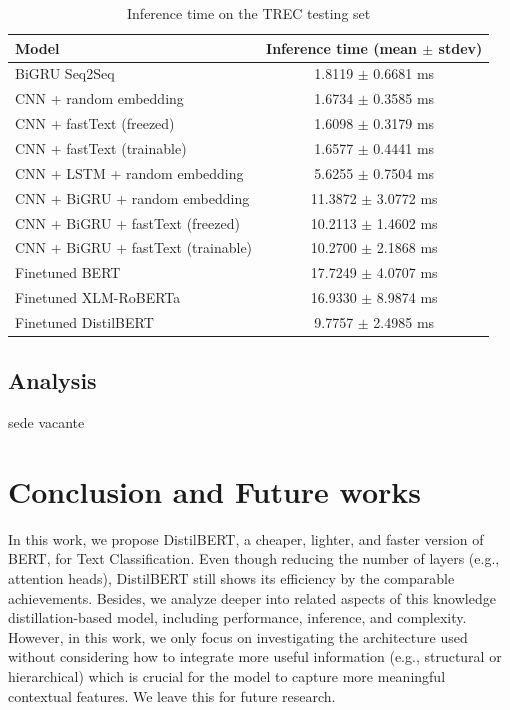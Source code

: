\documentclass[sn-mathphys,Numbered]{sn-jnl}%
\theoremstyle{thmstyleone}%
\theoremstyle{thmstyletwo}%
\theoremstyle{thmstylethree}%
\begin{document}
\begin{table}
\caption{Inference time on the TREC testing set}\label{tab:inference-TREC}
\begin{tabular*}{\textwidth}{@{\extracolsep\fill}lc}
\toprule
\textbf{Model}                     & \textbf{Inference time (mean $\pm$ stdev)} \\ \midrule
BiGRU Seq2Seq                      & 1.8119 $\pm$ 0.6681 ms                     \\ \midrule
CNN + random embedding             & 1.6734 $\pm$ 0.3585 ms                     \\
CNN + fastText (freezed)           & 1.6098 $\pm$ 0.3179 ms                     \\
CNN + fastText (trainable)         & 1.6577 $\pm$ 0.4441 ms                     \\ \midrule
CNN + LSTM + random embedding      & 5.6255 $\pm$ 0.7504 ms                     \\
CNN + BiGRU + random embedding     & 11.3872 $\pm$ 3.0772 ms                    \\
CNN + BiGRU + fastText (freezed)   & 10.2113 $\pm$ 1.4602 ms                    \\
CNN + BiGRU + fastText (trainable) & 10.2700 $\pm$ 2.1868 ms                    \\ \midrule
Finetuned BERT                     & 17.7249 $\pm$ 4.0707 ms                    \\
Finetuned XLM-RoBERTa              & 16.9330 $\pm$ 8.9874 ms                    \\ \midrule
Finetuned DistilBERT               & 9.7757 $\pm$ 2.4985 ms                     \\ \bottomrule
\end{tabular*}
\end{table}

\subsection{Analysis}
sede vacante

\section{Conclusion and Future works}\label{conclusionandfutureworks}
In this work, we propose DistilBERT, a cheaper, lighter, and faster version of BERT, for Text Classification. Even though reducing the number of layers (e.g., attention heads), DistilBERT still shows its efficiency by the comparable achievements. Besides, we analyze deeper into related aspects of this knowledge distillation-based model, including performance, inference, and complexity. However, in this work, we only focus on investigating the architecture used without considering how to integrate more useful information (e.g., structural or hierarchical) which is crucial for the model to capture more meaningful contextual features. We leave this for future research.
\end{document}
